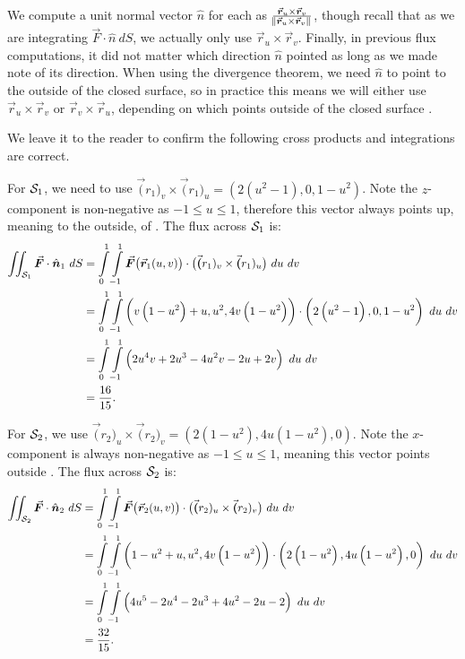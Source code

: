 \begin{example}
We compute a unit normal vector $\hat n$ for each as $\frac{\vec r_u\times\vec r_v}{\norm{\vec r_u\times\vec r_v}}$, though recall that as we are integrating $\vec F\cdot \hat n\ dS$, we actually only use $\vec r_u\times\vec r_v$. Finally, in previous flux computations, it did not matter which direction $\hat n$ pointed as long as we made note of its direction. When using the divergence theorem, we need $\hat n$ to point to the outside of the closed surface, so in practice this means we will either use $\vec r_u\times\vec r_v$ or $\vec r_v\times\vec r_u$, depending on which points outside of the closed surface \surfaceS.

We leave it to the reader to confirm the following cross products and integrations are correct.

For $\mathcal{S}_1$, we need to use $\vec (r_{1})_v\times\vec (r_{1})_u = \left( 2\left(u^2-1\right),0,1-u^2\right)$. Note the $z$-component is non-negative as $-1\leq u\leq 1$, therefore this vector always points up, meaning to the outside, of \surfaceS. The flux across $\mathcal{S}_1$ is:
\begin{align*}
 \iint_{\surfaceS_1} \vec F\cdot \hat n_1\ dS 
		&= \int\limits_0^1\int\limits_{-1}^1 \vec F\big(\vec r_1(u,v)\big)\cdot \big(\vec (r_{1})_v\times\vec (r_{1})_u\big)\ du\ dv\\
		&= \int\limits_0^1\int\limits_{-1}^1 \left( v\left(1-u^2\right)+u, u^2,4v\left(1-u^2\right)\right) \cdot \left( 2\left(u^2-1\right),0,1-u^2\right)\ du\ dv\\
		&= \int\limits_0^1\int\limits_{-1}^1 \left(2u^4v+2u^3-4u^2v-2u+2v\right)\ du\ dv\\
		&= \frac{16}{15}.
\end{align*}

For $\mathcal{S}_2$, we use $\vec (r_{2})_u\times\vec (r_{2})_v = \left( 2\left(1-u^2\right), 4u\left(1-u^2\right),0\right)$. Note the $x$-component is always non-negative as  $-1\leq u\leq 1$, meaning this vector points outside \surfaceS. The flux across $\mathcal{S}_2$ is:
\begin{align*}
 \iint_{\surfaceS_2} \vec F\cdot \hat n_2\ dS 
		&= \int\limits_0^1\int\limits_{-1}^1 \vec F\big(\vec r_2(u,v)\big)\cdot \big(\vec (r_{2})_u\times\vec (r_{2})_v\big)\ du\ dv\\
		&= \int\limits_0^1\int\limits_{-1}^1 \left( 1-u^2+u, u^2, 4v\left(1-u^2\right)\right) \cdot \left( 2\left(1-u^2\right), 4u\left(1-u^2\right),0\right)\ du\ dv\\
		&= \int\limits_0^1\int\limits_{-1}^1 \left(4u^5-2u^4-2u^3+4u^2-2u-2\right)\ du\ dv\\
		&= \frac{32}{15}.
\end{align*}



\end{example}
